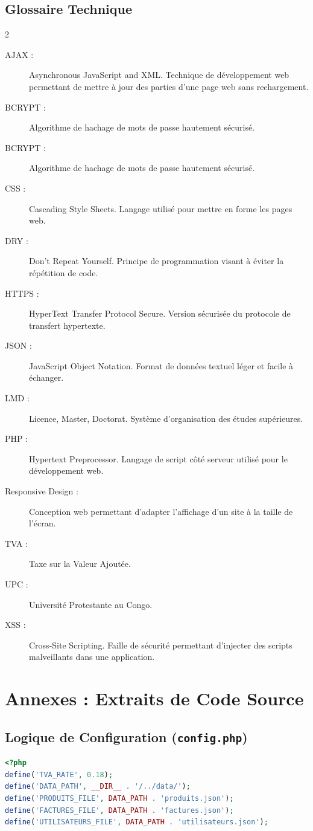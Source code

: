 \documentclass[12pt,a4paper]{report}
\begin{document}
\section{Glossaire Technique}
\begin{multicols}{2}
\begin{description}
    \item[AJAX :] Asynchronous JavaScript and XML. Technique de développement web permettant de mettre à jour des parties d'une page web sans rechargement.
    \item[BCRYPT :] Algorithme de hachage de mots de passe hautement sécurisé.
    \item[BCRYPT :] Algorithme de hachage de mots de passe hautement sécurisé.
    \item[CSS :] Cascading Style Sheets. Langage utilisé pour mettre en forme les pages web.
    \item[DRY :] Don't Repeat Yourself. Principe de programmation visant à éviter la répétition de code.
    \item[HTTPS :] HyperText Transfer Protocol Secure. Version sécurisée du protocole de transfert hypertexte.
    \item[JSON :] JavaScript Object Notation. Format de données textuel léger et facile à échanger.
    \item[LMD :] Licence, Master, Doctorat. Système d'organisation des études supérieures.
    \item[PHP :] Hypertext Preprocessor. Langage de script côté serveur utilisé pour le développement web.
    \item[Responsive Design :] Conception web permettant d'adapter l'affichage d'un site à la taille de l'écran.
    \item[TVA :] Taxe sur la Valeur Ajoutée.
    \item[UPC :] Université Protestante au Congo.
    \item[XSS :] Cross-Site Scripting. Faille de sécurité permettant d'injecter des scripts malveillants dans une application.
\end{description}
\end{multicols}

\chapter{Annexes : Extraits de Code Source}
\section{Logique de Configuration (\texttt{config.php})}
\begin{lstlisting}[language=PHP]
<?php
define('TVA_RATE', 0.18);
define('DATA_PATH', __DIR__ . '/../data/');
define('PRODUITS_FILE', DATA_PATH . 'produits.json');
define('FACTURES_FILE', DATA_PATH . 'factures.json');
define('UTILISATEURS_FILE', DATA_PATH . 'utilisateurs.json');
\end{lstlisting}
\end{document}
